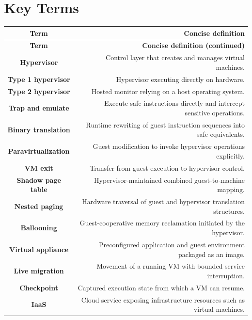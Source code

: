 \documentclass[10pt,letterpaper]{article}
\begin{document}
\section*{Key Terms}
\small
\begin{longtable}{C N}
\color{white}\textbf{Term} & \color{white}\textbf{Concise definition}\\
\endfirsthead
{}\color{white}\textbf{Term} & \color{white}\textbf{Concise definition (continued)}\\
\endhead
\textbf{Hypervisor} & Control layer that creates and manages virtual machines.\\\hline
\textbf{Type 1 hypervisor} & Hypervisor executing directly on hardware.\\\hline
\textbf{Type 2 hypervisor} & Hosted monitor relying on a host operating system.\\\hline
\textbf{Trap and emulate} & Execute safe instructions directly and intercept sensitive operations.\\\hline
\textbf{Binary translation} & Runtime rewriting of guest instruction sequences into safe equivalents.\\\hline
\textbf{Paravirtualization} & Guest modification to invoke hypervisor operations explicitly.\\\hline
\textbf{VM exit} & Transfer from guest execution to hypervisor control.\\\hline
\textbf{Shadow page table} & Hypervisor-maintained combined guest-to-machine mapping.\\\hline
\textbf{Nested paging} & Hardware traversal of guest and hypervisor translation structures.\\\hline
\textbf{Ballooning} & Guest-cooperative memory reclamation initiated by the hypervisor.\\\hline
\textbf{Virtual appliance} & Preconfigured application and guest environment packaged as an image.\\\hline
\textbf{Live migration} & Movement of a running VM with bounded service interruption.\\\hline
\textbf{Checkpoint} & Captured execution state from which a VM can resume.\\\hline
\textbf{IaaS} & Cloud service exposing infrastructure resources such as virtual machines.\\\hline
\end{longtable}
\normalsize
\end{document}
